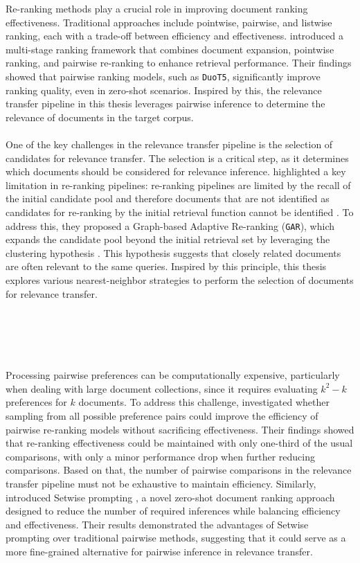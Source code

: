 Re-ranking methods play a crucial role in improving document ranking effectiveness. Traditional approaches include pointwise, pairwise, and listwise ranking, each with a trade-off between efficiency and effectiveness. \citet{pradeep:2021} introduced a multi-stage ranking framework that combines document expansion, pointwise ranking, and pairwise re-ranking to enhance retrieval performance. Their findings showed that pairwise ranking models, such as \texttt{DuoT5}, significantly improve ranking quality, even in zero-shot scenarios. Inspired by this, the relevance transfer pipeline in this thesis leverages pairwise inference to determine the relevance of documents in the target corpus.
\\\\
One of the key challenges in the relevance transfer pipeline is the selection of candidates for relevance transfer. The selection is a critical step, as it determines which documents should be considered for relevance inference. \mbox{\citet{macavaney:2022}} highlighted a key limitation in re-ranking pipelines: \glqq re-ranking pipelines are limited by the recall of the initial candidate pool and therefore documents that are not identified as candidates for re-ranking by the initial retrieval function cannot be identified \grqq{}. To address this, they proposed a Graph-based Adaptive Re-ranking (\texttt{GAR}), which expands the candidate pool beyond the initial retrieval set by leveraging the clustering hypothesis \citep{jardine:1971}. This hypothesis suggests that closely related documents are often relevant to the same queries. Inspired by this principle, this thesis explores various nearest-neighbor strategies to perform the selection of documents for relevance transfer.
\\\\\\\\\\\\
Processing pairwise preferences can be computationally expensive, particularly when dealing with large document collections, since it requires evaluating $k^2-k$ preferences for $k$ documents. To address this challenge, \mbox{\citet{gienapp:2022}} investigated whether sampling from all possible preference pairs could improve the efficiency of pairwise re-ranking models without sacrificing effectiveness. Their findings showed that re-ranking effectiveness could be maintained with only one-third of the usual comparisons, with only a minor performance drop when further reducing comparisons. Based on that, the number of pairwise comparisons in the relevance transfer pipeline must not be exhaustive to maintain efficiency. Similarly, \citet{zhuang:2024} introduced \glqq Setwise prompting \grqq{}, a novel zero-shot document ranking approach designed to reduce the number of required inferences while balancing efficiency and effectiveness. Their results demonstrated the advantages of Setwise prompting over traditional pairwise methods, suggesting that it could serve as a more fine-grained alternative for pairwise inference in relevance transfer.
